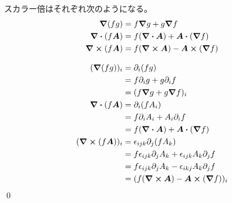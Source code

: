 \documentclass[uplatex,dvipdfmx,a4paper,11pt]{jlreq}
\makeatletter
\newcommand{\rot}{\curl}
\theoremstyle{definition}
\renewenvironment{proof}[1][\proofname]{\par
  \normalfont
  \topsep6\p@\@plus6\p@ \trivlist
  \item[\hskip\labelsep{\bfseries #1}\@addpunct{\bfseries}]\ignorespaces\quad\par
}{%
  \qed\endtrivlist\@endpefalse
}
\renewcommand\proofname{証明}
\makeatother
\begin{document}
\begin{theorem}[勾配・発散・回転のスカラー倍]
  スカラー倍はそれぞれ次のようになる。
  \begin{align}
    \grad{(fg)}     & = f\grad{g} + g\grad{f}                    \\
    \div{(f\bm{A})} & = f(\div{\bm{A}}) + \bm{A}\vdot(\grad{f})  \\
    \rot{(f\bm{A})} & = f(\rot{\bm{A}}) - \bm{A}\cross(\grad{f})
  \end{align}
\end{theorem}
\begin{proof}
  \begin{align}
    (\grad{(fg)})_i     & = \partial_i(fg)                                              \\
                        & = f\partial_i g + g\partial_i f                               \\
                        & = (f\grad{g} + g\grad{f})_i                                   \\
    \div{(f\bm{A})}     & = \partial_i(fA_i)                                            \\
                        & = f\partial_iA_i + A_i\partial_if                             \\
                        & = f(\div{\bm{A}}) + \bm{A}\vdot(\grad{f})                     \\
    (\rot{(f\bm{A})})_i & = \epsilon_{ijk}\partial_j(fA_k)                              \\
                        & = f\epsilon_{ijk}\partial_jA_k + \epsilon_{ijk}A_k\partial_jf \\
                        & = f\epsilon_{ijk}\partial_jA_k - \epsilon_{ikj}A_k\partial_jf \\
                        & = (f(\rot{\bm{A}}) - \bm{A}\cross(\grad{f}))_i
  \end{align}
\end{proof}
\end{document}

